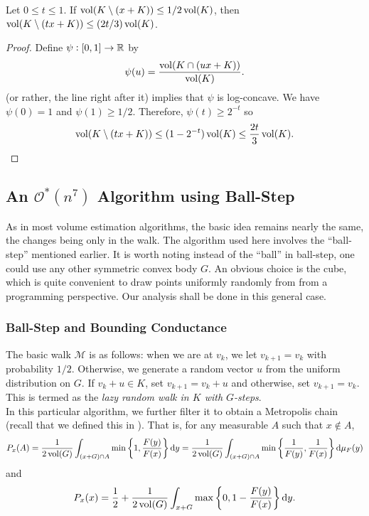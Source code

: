 \begin{lemma}
	\label{lemma 4.39}
	Let $0\leq t\leq 1$. If $\operatorname{vol}(K\setminus (x+K)) \leq 1/2 \operatorname{vol}(K)$, then $\operatorname{vol}(K\setminus (tx+K)) \leq (2t/3) \operatorname{vol}(K)$.
\end{lemma}
\begin{proof}
	Define $\psi:[0,1]\to\mathbb{R}$ by
	\[ \psi(u) = \frac{\operatorname{vol}(K\cap (ux+K))}{\operatorname{vol}(K)}. \]
	 (or rather, the line right after it) implies that $\psi$ is log-concave. We have $\psi(0)=1$ and $\psi(1)\geq 1/2$. Therefore, $\psi(t) \geq 2^{-t}$ so
	\[ \operatorname{vol}(K\setminus (tx+K)) \leq (1 - 2^{-t})\operatorname{vol}(K) \leq \frac{2t}{3}\operatorname{vol}(K).\qedhere \]
\end{proof}


\subsection{An \texorpdfstring{$\mathcal{O}^*(n^7)$}{O(n7)} Algorithm using Ball-Step}

As in most volume estimation algorithms, the basic idea remains nearly the same, the changes being only in the walk. The algorithm used here involves the ``ball-step'' mentioned earlier. It is worth noting instead of the ``ball'' in ball-step, one could use any other symmetric convex body $G$. An obvious choice is the cube, which is quite convenient to draw points uniformly randomly from from a programming perspective. Our analysis shall be done in this general case.

\subsubsection{Ball-Step and Bounding Conductance}

The basic walk $\mathcal{M}$ is as follows: when we are at $v_k$, we let $v_{k+1}=v_k$ with probability $1/2$. Otherwise, we generate a random vector $u$ from the uniform distribution on $G$. If $v_k+u\in K$, set $v_{k+1}=v_k+u$ and otherwise, set $v_{k+1}=v_k$. This is termed as the \textit{lazy random walk in $K$ with $G$-steps}.\\
In this particular algorithm, we further filter it to obtain a Metropolis chain (recall that we defined this in ). That is, for any measurable $A$ such that $x\not\in A$,
\[ P_x(A) = \frac{1}{2\operatorname{vol}(G)} \int_{(x+G)\cap A} \min\left\{1,\frac{F(y)}{F(x)}\right\}\operatorname{d}\!{y} = \frac{1}{2\operatorname{vol}(G)} \int_{(x+G)\cap A} \min\left\{\frac{1}{F(y)},\frac{1}{F(x)}\right\}\operatorname{d}\!{\mu}_F(y) \]
and
\[ P_x(x) = \frac{1}{2} + \frac{1}{2\operatorname{vol}(G)} \int_{x+G} \max\left\{0,1-\frac{F(y)}{F(x)}\right\}\operatorname{d}\!{y}. \]

